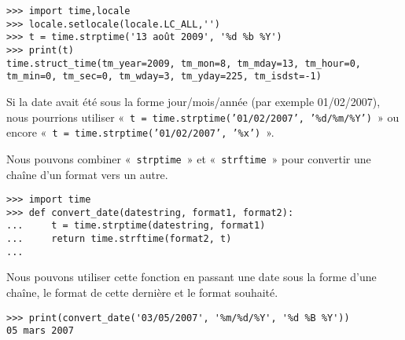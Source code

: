 \begin{Verbatim}[frame=single,rulecolor=\color{gray}]
>>> import time,locale
>>> locale.setlocale(locale.LC_ALL,'')
>>> t = time.strptime('13 août 2009', '%d %b %Y')
>>> print(t)
time.struct_time(tm_year=2009, tm_mon=8, tm_mday=13, tm_hour=0, 
tm_min=0, tm_sec=0, tm_wday=3, tm_yday=225, tm_isdst=-1)
\end{Verbatim}

Si la date avait été sous la forme jour/mois/année (par exemple 01/02/2007), nous pourrions utiliser «~\texttt{t = time.strptime('01/02/2007', '\%d/\%m/\%Y')}~» ou encore «~\texttt{t = time.strptime('01/02/2007', '\%x')}~».


Nous pouvons combiner «~\texttt{strptime}~» et «~\texttt{strftime}~» pour convertir une chaîne d'un format vers un autre.

\begin{Verbatim}[frame=single,rulecolor=\color{gray}]
>>> import time
>>> def convert_date(datestring, format1, format2):
...     t = time.strptime(datestring, format1)
...     return time.strftime(format2, t)
...
\end{Verbatim}

Nous pouvons utiliser cette fonction en passant une date sous la forme d'une chaîne, le format de cette dernière et le format souhaité.


\begin{Verbatim}[frame=single,rulecolor=\color{gray}]
>>> print(convert_date('03/05/2007', '%m/%d/%Y', '%d %B %Y'))
05 mars 2007
\end{Verbatim}

